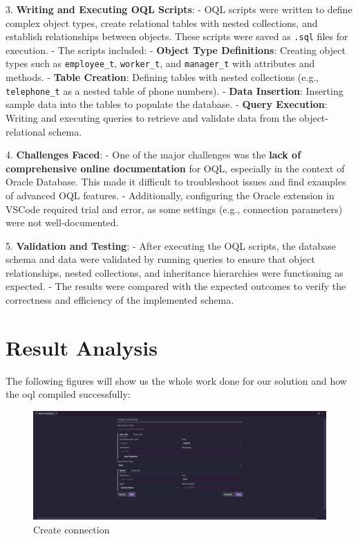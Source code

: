 \documentclass{article}
\begin{document}
3. \textbf{Writing and Executing OQL Scripts}:
   - OQL scripts were written to define complex object types, create relational tables with nested collections, and establish relationships between objects. These scripts were saved as \texttt{.sql} files for execution.
   - The scripts included:
     - \textbf{Object Type Definitions}: Creating object types such as \texttt{employee\_t}, \texttt{worker\_t}, and \texttt{manager\_t} with attributes and methods.
     - \textbf{Table Creation}: Defining tables with nested collections (e.g., \texttt{telephone\_t} as a nested table of phone numbers).
     - \textbf{Data Insertion}: Inserting sample data into the tables to populate the database.
     - \textbf{Query Execution}: Writing and executing queries to retrieve and validate data from the object-relational schema.

4. \textbf{Challenges Faced}:
   - One of the major challenges was the \textbf{lack of comprehensive online documentation} for OQL, especially in the context of Oracle Database. This made it difficult to troubleshoot issues and find examples of advanced OQL features.
   - Additionally, configuring the Oracle extension in VSCode required trial and error, as some settings (e.g., connection parameters) were not well-documented.

5. \textbf{Validation and Testing}:
   - After executing the OQL scripts, the database schema and data were validated by running queries to ensure that object relationships, nested collections, and inheritance hierarchies were functioning as expected.
   - The results were compared with the expected outcomes to verify the correctness and efficiency of the implemented schema.

\section{Result Analysis}
The following figures will show us the whole work done for our solution and how the oql compiled successfully:

\begin{figure}[H]
	\centering
	\includegraphics[width=1\textwidth]{imgs/cconn.jpeg}
	\caption{Create connection}
	\label{fig:2}
\end{figure}
\end{document}
